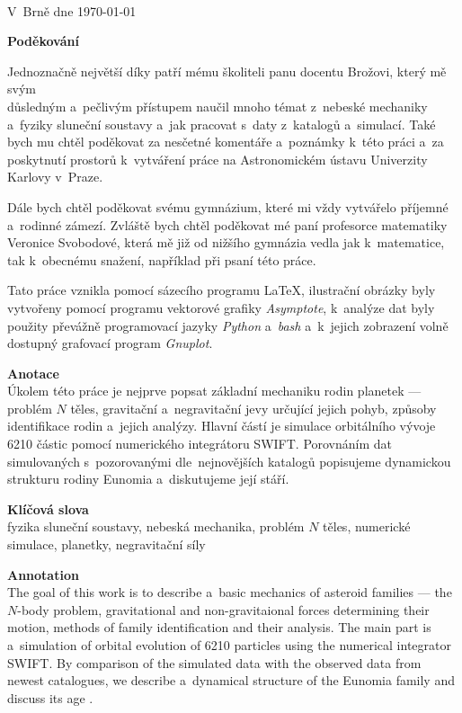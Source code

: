 \documentclass[A4paper, 12pt, oneside, openany]{book}
\begin{document}
\

V~Brně dne \today\ \dotfill \hspace{10mm}

\newpage

{\large \bfseries Poděkování}

Jednoznačně největší díky patří mému školiteli panu docentu Brožovi, který mě svým \\důsledným a~pečlivým přístupem naučil mnoho témat z~nebeské mechaniky a~fyziky sluneční soustavy a~jak pracovat s~daty z~katalogů a~simulací. Také bych mu chtěl poděkovat za nesčetné komentáře a~poznámky k~této práci a~za poskytnutí prostorů k~vytváření práce na Astronomickém ústavu Univerzity Karlovy v~Praze.

Dále bych chtěl poděkovat svému gymnázium, které mi vždy vytvářelo příjemné a~rodinné zámezí. Zvláště bych chtěl poděkovat mé paní profesorce matematiky Veronice Svobodové, která mě již od nižšího gymnázia vedla jak k~matematice, tak k~obecnému snažení, například při psaní této práce.

Tato práce vznikla pomocí sázecího programu \LaTeX, ilustrační obrázky byly vytvořeny pomocí programu vektorové grafiky \textit{Asymptote}, k~analýze dat byly použity převážně programovací jazyky \textit{Python} a~\textit{bash} a~k~jejich zobrazení volně dostupný grafovací program \textit{Gnuplot}.

\newpage

{\large \bfseries Anotace}\\
Úkolem této práce je nejprve popsat základní mechaniku rodin planetek --- problém $N$ těles, gravitační a~negravitační jevy určující jejich pohyb, způsoby identifikace rodin a~jejich analýzy. Hlavní částí je simulace orbitálního vývoje 6210 částic pomocí numerického integrátoru SWIFT. Porovnáním dat simulovaných s~pozorovanými dle~nejnovějších katalogů popisujeme dynamickou strukturu rodiny Eunomia a~diskutujeme její stáří.

{\large \bfseries Klíčová slova}\\
fyzika sluneční soustavy, nebeská mechanika, problém $N$ těles, numerické simulace, planetky, negravitační síly

\vspace{24pt}

{\large \bfseries Annotation}\\
The goal of this work is to describe a~basic mechanics of asteroid families --- the $N$-body problem, gravitational and non-gravitaional forces determining their motion, methods of family identification and their analysis. The main part is a~simulation of orbital evolution of 6210 particles using the numerical integrator SWIFT. By comparison of the simulated data with the observed data from newest catalogues, we describe a~dynamical structure of the Eunomia family and discuss its age .
\end{document}
